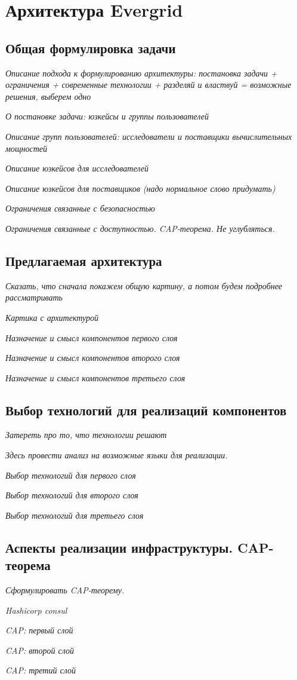 \chapter{Архитектура Evergrid}

\section{Общая формулировка задачи}

\textit{Описание подхода к формулированию архитектуры: постановка задачи + ограничения + современные технологии + разделяй и властвуй = возможные решения, выберем одно}

\textit{О постановке задачи: юзкейсы и группы пользователей}

\textit{Описание групп пользователей: исследователи и поставщики вычислительных мощностей}

\textit{Описание юзкейсов для исследователей}

\textit{Описание юзкейсов для поставщиков (надо нормальное слово придумать)}

\textit{Ограничения связанные с безопасностью}

\textit{Ограничения связанные с доступностью. CAP-теорема. Не углубляться.}


\section{Предлагаемая архитектура}

\textit{Сказать, что сначала покажем общую картину, а потом будем подробнее рассматривать}

\textit{Картика с архитектурой}

\textit{Назначение и смысл компонентов первого слоя}

\textit{Назначение и смысл компонентов второго слоя}

\textit{Назначение и смысл компонентов третьего слоя}


\section{Выбор технологий для реализаций компонентов}

\textit{Затереть про то, что технологии решают}

\textit{Здесь провести анализ на возможные языки для реализации.}

\textit{Выбор технологий для первого слоя}

\textit{Выбор технологий для второго слоя}

\textit{Выбор технологий для третьего слоя}


\section{Аспекты реализации инфраструктуры. CAP-теорема}

\textit{Сформулировать CAP-теорему.}

\textit{Hashicorp consul}

\textit{CAP: первый слой}

\textit{CAP: второй слой}

\textit{CAP: третий слой}